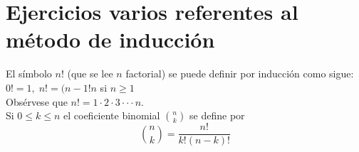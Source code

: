 \section{Ejercicios varios referentes al método de inducción}
\begin{tcolorbox}[colframe=white]
\begin{def.}
El símbolo $n!$ (que se lee $n$ factorial) se puede definir por inducción como sigue: $0!=1, \; n!=(n-1!n$ si $n\geq 1$\\
Obsérvese que $n!=1\cdot 2 \cdot 3 \cdot \cdot \cdot n.$\\
Si $0\leq k \leq n$ el coeficiente binomial ${n \choose k}$ se define por 
$${n \choose k} = \dfrac{n!}{k!(n-k)!}$$
\end{def.}
\end{tcolorbox}
